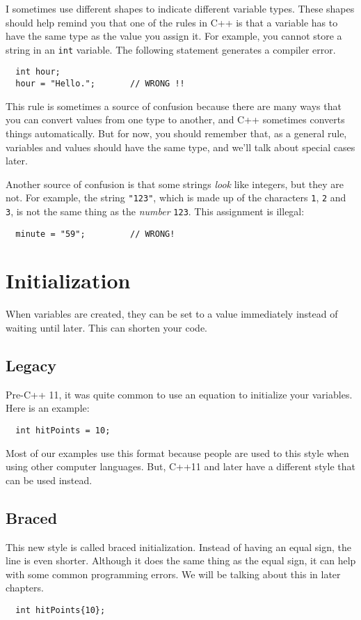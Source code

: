 \vspace{0.1in}
\centerline{}
\vspace{0.1in}

I sometimes use different shapes to indicate different
variable types.  These shapes should help remind you that one of the
rules in C++ is that a variable has to have the same type as the
value you assign it.  For example, you cannot store a string in
an {\tt int} variable.  The following statement generates a compiler
error.

\begin{lstlisting}
  int hour;
  hour = "Hello.";       // WRONG !!
\end{lstlisting}

%
This rule is sometimes a source of confusion because there are many
ways that you can convert values from one type to another, and C++
sometimes converts things automatically.  But for now, you should
remember that, as a general rule, variables and values should have the same
type, and we'll talk about special cases later.

Another source of confusion is that some strings {\em look}
like integers, but they are not.  For example,
the string {\tt "123"}, which is made up of the
characters {\tt 1}, {\tt 2} and {\tt 3}, is not
the same thing as the {\em number} {\tt 123}.
This assignment is illegal:

\begin{verbatim}
  minute = "59";         // WRONG!
\end{verbatim}
%
\section{Initialization}
When variables are created, they can be set to a value immediately instead of waiting until later. This can shorten your code. 

\subsection{Legacy}
Pre-C++ 11, it was quite common to use an equation to initialize 
your variables.
Here is an example:
\begin{verbatim}
  int hitPoints = 10;
\end{verbatim}
Most of our examples use this format because people are used to 
this style when using other computer languages. But, C++11 and later
have a different style that can be used instead.
\subsection{Braced}
This new style is called braced initialization. Instead of having an equal sign, the line is even shorter. Although it does the same thing as the equal sign, it can help with some common programming errors. We will be talking about this in later chapters.
\begin{verbatim}
  int hitPoints{10};
\end{verbatim}
